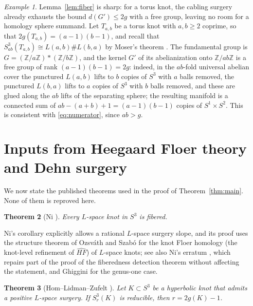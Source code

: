 \documentclass[12pt]{article}
\newcommand{\Z}{\mathbb Z}
\newcommand{\Surg}[2]{S^3_{#1}(#2)}
\newcommand{\HFhat}{\widehat{HF}}
\newcommand{\rk}{d}
\newtheorem{theorem}{Theorem}[section]
\theoremstyle{definition}
\theoremstyle{remark}
\newtheorem{example}[theorem]{Example}
\begin{document}
\begin{example}\label{ex:torus}
Lemma~\ref{lem:fiber} is sharp: for a torus knot, the cabling surgery
already exhausts the bound \(\rk(G')\leq2g\) with a free group, leaving
no room for a homology sphere summand. Let \(T_{a,b}\) be a torus knot
with \(a,b\geq2\) coprime, so that \(2g(T_{a,b})=(a-1)(b-1)\), and recall
that \(\Surg{ab}{T_{a,b}}\cong L(a,b)\#L(b,a)\) by Moser's theorem
\cite{Moser1971}. The fundamental group is \(G=(\Z/a\Z)*(\Z/b\Z)\), and
the kernel \(G'\) of its abelianization onto \(\Z/ab\Z\) is a free group
of rank \((a-1)(b-1)=2g\): indeed, in the \(ab\)-fold universal abelian
cover the punctured \(L(a,b)\) lifts to \(b\) copies of \(S^3\) with
\(a\) balls removed, the punctured \(L(b,a)\) lifts to \(a\) copies of
\(S^3\) with \(b\) balls removed, and these are glued along the \(ab\)
lifts of the separating sphere; the resulting manifold is a connected
sum of \(ab-(a+b)+1=(a-1)(b-1)\) copies of \(S^1\times S^2\). This is
consistent with \eqref{eq:numerator}, since \(ab>g\).
\end{example}

\section{Inputs from Heegaard Floer theory and Dehn surgery}\label{sec:inputs}

We now state the published theorems used in the proof of
Theorem~\ref{thm:main}. None of them is reproved here.

\begin{theorem}[Ni {\cite[Corollary~1.3]{Ni2007}}]\label{thm:ni}
Every \(L\)-space knot in \(S^3\) is fibered.
\end{theorem}

Ni's corollary explicitly allows a rational \(L\)-space surgery slope,
and its proof uses the structure theorem of Ozsv\'ath and Szab\'o
\cite{OS2005} for the knot Floer homology (the knot-level refinement of
\(\HFhat\)) of \(L\)-space knots; see also
Ni's erratum \cite{NiCorrigendum}, which repairs part of the proof of
the fiberedness detection theorem without affecting the statement, and
Ghiggini \cite{Ghiggini2008} for the genus-one case.

\begin{theorem}[Hom--Lidman--Zufelt {\cite[Theorem~1.3]{HLZ2015}}]\label{thm:hlz}
Let \(K\subset S^3\) be a hyperbolic knot that admits a positive
\(L\)-space surgery. If \(\Surg{r}{K}\) is reducible, then
\(r=2g(K)-1\).
\end{theorem}
\end{document}
